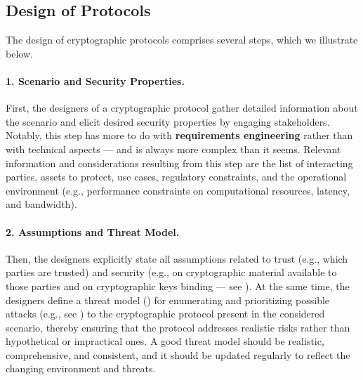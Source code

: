 \subsection{Design of Protocols}\label{sec:security_of_cryptographic_protocols:design}

The design of cryptographic protocols comprises several steps, which we illustrate below.

\paragraph*{1. Scenario and Security Properties.} First, the designers of a cryptographic protocol gather detailed information about the scenario and elicit desired security properties by engaging stakeholders. Notably, this step has more to do with \textbf{requirements engineering} rather than with technical aspects --- and is always more complex than it seems. Relevant information and considerations resulting from this step are the list of interacting parties, assets to protect, use cases, regulatory constraints, and the operational environment (e.g., performance constraints on computational resources, latency, and bandwidth).


\paragraph*{2. Assumptions and Threat Model.} Then, the designers explicitly state all assumptions related to trust (e.g., which parties are trusted) and security (e.g., on cryptographic material available to those parties and on cryptographic keys binding --- see ). At the same time, the designers define a threat model () for enumerating and prioritizing possible attacks (e.g., see ) to the cryptographic protocol present in the considered scenario, thereby ensuring that the protocol addresses realistic risks rather than hypothetical or impractical ones. A good threat model should be realistic, comprehensive, and consistent, and it should be updated regularly to reflect the changing environment and threats.

